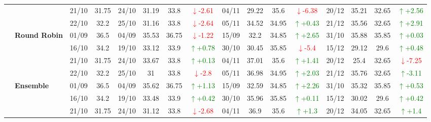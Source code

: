 \documentclass{ieeeaccess}
\begin{document}
{\begin{longtable}{llcc|cccc|cccc|cccc}
&
& 21/10 & 31.75 & 24/10 & 31.19 & 33.8 & \textcolor{red}{\(\downarrow\)-2.61} & 04/11 & 29.22 & 35.6 & \textcolor{red}{\(\downarrow\)-6.38} & 20/12 & 35.21 & 32.65 &\textcolor{green}{\(\uparrow\)+2.56}\\

&
& 22/10 & 32.2 & 25/10 & 31.16 & 33.8 & \textcolor{red}{\(\downarrow\)-2.64} & 05/11 & 34.52 & 34.95 & \textcolor{green}{\(\uparrow\)+0.43} & 21/12 & 35.56 & 32.65 & \textcolor{green}{\(\uparrow\)+2.91} \\
\cmidrule(lr){2-16}


& \textbf{Round Robin}
& 01/09 & 36.5 & 04/09 & 35.53 & 36.75 & \textcolor{red}{\(\downarrow\)-1.22} & 15/09 & 32.2 & 34.85 & \textcolor{green}{\(\uparrow\)+2.65} & 31/10 & 35.88 & 35.85 & \textcolor{green}{\(\uparrow\)+0.03} \\

&
& 16/10 & 34.2 & 19/10 & 33.12 & 33.9 & \textcolor{green}{\(\uparrow\)+0.78} & 30/10 & 30.45 & 35.85 & \textcolor{red}{\(\downarrow\)-5.4} & 15/12 & 29.12 & 29.6 & \textcolor{green}{\(\uparrow\)+0.48} \\

&
& 21/10 & 31.75 & 24/10 & 33.67 & 33.8 & \textcolor{green}{\(\uparrow\)+0.13} & 04/11 & 37.01 & 35.6 & \textcolor{green}{\(\uparrow\)+1.41} & 20/12 & 25.4 & 32.65 &\textcolor{red}{\(\downarrow\)-7.25}\\

&
& 22/10 & 32.2 & 25/10 & 31 & 33.8 & \textcolor{red}{\(\downarrow\)-2.8} & 05/11 & 36.98 & 34.95 & \textcolor{green}{\(\uparrow\)+2.03} & 21/12 & 35.76 & 32.65 & \textcolor{green}{\(\uparrow\)-3.11} \\
\cmidrule(lr){2-16}



& \textbf{Ensemble}
& 01/09 & 36.5 & 04/09 & 35.62 & 36.75 & \textcolor{green}{\(\uparrow\)+1.13} & 15/09 & 32.59 & 34.85 & \textcolor{green}{\(\uparrow\)+2.26} & 31/10 & 35.32 & 35.85 & \textcolor{green}{\(\uparrow\)+0.53} \\

&
& 16/10 & 34.2 & 19/10 & 33.48 & 33.9 & \textcolor{green}{\(\uparrow\)+0.42} & 30/10 & 35.96 & 35.85 & \textcolor{green}{\(\uparrow\)+0.11} & 15/12 & 30.02 & 29.6 & \textcolor{green}{\(\uparrow\)+0.42} \\

&
& 21/10 & 31.75 & 24/10 & 31.12 & 33.8 & \textcolor{red}{\(\downarrow\)-2.68} & 04/11 & 36.9 & 35.6 & \textcolor{green}{\(\uparrow\)+1.3} & 20/12 & 34.05 & 32.65 &\textcolor{green}{\(\uparrow\)+1.4}\\


\end{longtable}}
\end{document}

